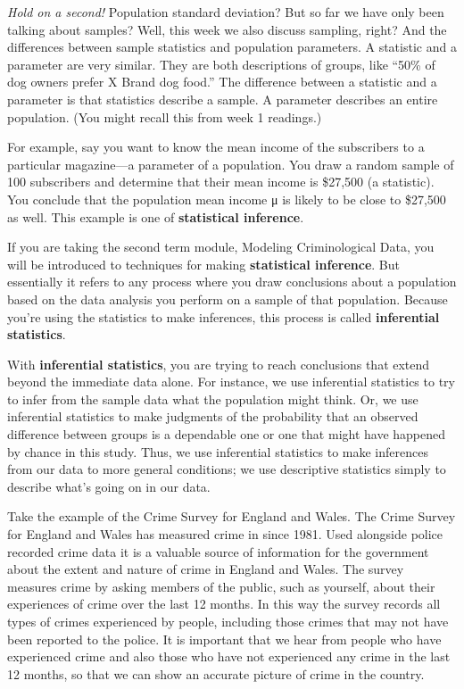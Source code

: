 \documentclass[]{book}
\theoremstyle{definition}
\theoremstyle{definition}
\theoremstyle{definition}
\theoremstyle{remark}
\begin{document}
\emph{Hold on a second!} Population standard deviation? But so far we
have only been talking about samples? Well, this week we also discuss
sampling, right? And the differences between sample statistics and
population parameters. A statistic and a parameter are very similar.
They are both descriptions of groups, like ``50\% of dog owners prefer X
Brand dog food.'' The difference between a statistic and a parameter is
that statistics describe a sample. A parameter describes an entire
population. (You might recall this from week 1 readings.)

For example, say you want to know the mean income of the subscribers to
a particular magazine---a parameter of a population. You draw a random
sample of 100 subscribers and determine that their mean income is
\$27,500 (a statistic). You conclude that the population mean income μ
is likely to be close to \$27,500 as well. This example is one of
\textbf{statistical inference}.

If you are taking the second term module, Modeling Criminological Data,
you will be introduced to techniques for making \textbf{statistical
inference}. But essentially it refers to any process where you draw
conclusions about a population based on the data analysis you perform on
a sample of that population. Because you're using the statistics to make
inferences, this process is called \textbf{inferential statistics}.

With \textbf{inferential statistics}, you are trying to reach
conclusions that extend beyond the immediate data alone. For instance,
we use inferential statistics to try to infer from the sample data what
the population might think. Or, we use inferential statistics to make
judgments of the probability that an observed difference between groups
is a dependable one or one that might have happened by chance in this
study. Thus, we use inferential statistics to make inferences from our
data to more general conditions; we use descriptive statistics simply to
describe what's going on in our data.

Take the example of the Crime Survey for England and Wales. The Crime
Survey for England and Wales has measured crime in since 1981. Used
alongside police recorded crime data it is a valuable source of
information for the government about the extent and nature of crime in
England and Wales. The survey measures crime by asking members of the
public, such as yourself, about their experiences of crime over the last
12 months. In this way the survey records all types of crimes
experienced by people, including those crimes that may not have been
reported to the police. It is important that we hear from people who
have experienced crime and also those who have not experienced any crime
in the last 12 months, so that we can show an accurate picture of crime
in the country.
\end{document}
